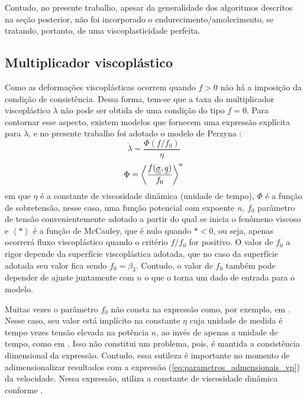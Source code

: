 Contudo, no presente trabalho, apesar da generalidade dos algoritmos descritos na seção posterior, não foi incorporado o endurecimento/amolecimento, se tratando, portanto, de uma viscoplasticidade perfeita.

\subsection{Multiplicador viscoplástico}
Como as deformações viscoplásticas ocorrem quando $f>0$ não há a imposição da condição de consistência. Dessa forma, tem-se que a taxa do multiplicador viscoplástico $\dot \lambda$ não pode ser obtida de uma condição do tipo $\dot f = 0$. Para contornar esse aspecto, existem modelos que fornecem uma expressão explícita para $\dot \lambda$, e no presente trabalho foi adotado o modelo de Perzyna \cite[p. 823]{Zienkiewicz1974}:
\begin{equation}
	\label{eq:lambdavp}
	\dot \lambda = \dfrac{\Phi(f/f_0)}{\eta}
\end{equation}
\begin{equation}
	\label{eq:sobretensao}
	\Phi = \left\langle  \dfrac{f(\underline{\underline \sigma},\underline q)}{f_0} \right\rangle^n
\end{equation}
em que $\eta$ é a constante de viscosidade dinâmica (unidade de tempo), $\Phi$ é a função de sobretensão, nesse caso, uma função potencial com expoente $n$, $f_0$ parâmetro de tensão convenientemente adotado a partir do qual se inicia o fenômeno viscoso e $\left\langle * \right\rangle$ é a função de McCauley, que é nulo quando $*<0$, ou seja, apenas ocorrerá fluxo viscoplástico quando o critério $f/f_0$ for positivo. O valor de $f_0$ a rigor depende da superfície viscoplástica adotada, que no caso da superfície adotada seu valor fica sendo $f_0 = \beta_3$. Contudo, o valor de $f_0$ também pode depender de ajuste juntamente com $n$ o que o torna um dado de entrada para o modelo.

Muitas vezes o parâmetro $f_0$ não consta na expressão como, por exemplo, em . Nesse caso, seu valor está implícito na constante $\eta$ cuja unidade de medida é tempo vezes tensão elevada na potência $n$, ao invés de apenas a unidade de tempo, como em . Isso não constitui um problema, pois, é mantida a consistência dimensional da expressão. Contudo, essa sutileza é importante no momento de adimensionalizar resultados com a expressão (\ref{eq:parametros_admensionais_vp}) da velocidade. Nessa expressão,  utiliza a constante de viscosidade dinâmica conforme .

